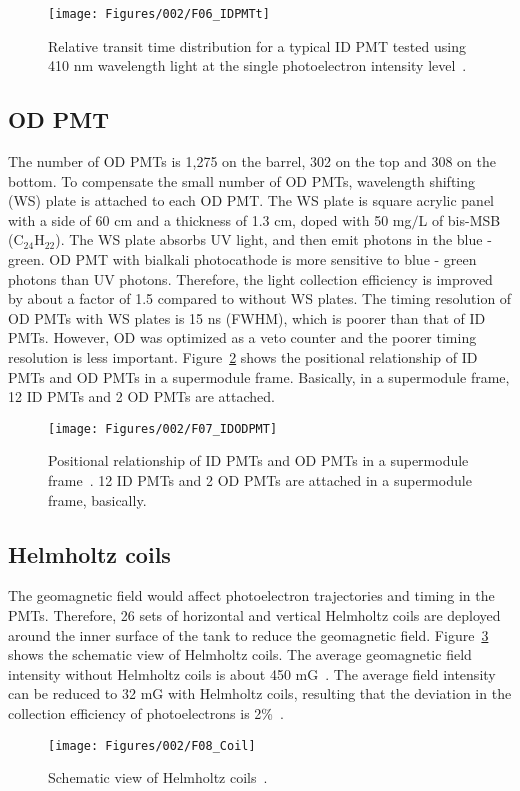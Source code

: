 \begin{figure}[tbp]
	\centering
	\texttt{[image: Figures/002/F06\_IDPMTt]}
	\caption[Relative transit time distribution for a typical ID PMT tested using 410 nm wavelength light at the single photoelectron intensity level]{\label{002_F06_IDPMTt} Relative transit time distribution for a typical ID PMT tested using 410 nm wavelength light at the single photoelectron intensity level~\cite{2003Fukuda}.}
\end{figure}

\subsection{OD PMT}
\vs\hs The number of OD PMTs is 1,275 on the barrel, 302 on the top and 308 on the bottom.
To compensate the small number of OD PMTs, wavelength shifting (WS) plate is attached to each OD PMT.
The WS plate is square acrylic panel with a side of 60 cm and a thickness of 1.3 cm, doped with 50 mg$/$L of bis-MSB (C$_{\text{24}}$H$_{\text{22}}$).
The WS plate absorbs UV light, and then emit photons in the blue - green.
OD PMT with bialkali photocathode is more sensitive to blue - green photons than UV photons.
Therefore, the light collection efficiency is improved by about a factor of 1.5 compared to without WS plates.
The timing resolution of OD PMTs with WS plates is 15 ns (FWHM), which is poorer than that of ID PMTs.
However, OD was optimized as a veto counter and the poorer timing resolution is less important.
Figure~\ref{002_F07_IDODPMT} shows the positional relationship of ID PMTs and OD PMTs in a supermodule frame.
Basically, in a supermodule frame, 12 ID PMTs and 2 OD PMTs are attached.

\begin{figure}[h]
	\centering
	\texttt{[image: Figures/002/F07\_IDODPMT]}
	\caption[Positional relationship of ID PMTs and OD PMTs in a supermodule frame]{\label{002_F07_IDODPMT} Positional relationship of ID PMTs and OD PMTs in a supermodule frame~\cite{1997ZoaPhD}. 12 ID PMTs and 2 OD PMTs are attached in a supermodule frame, basically.}
\end{figure}

\subsection{Helmholtz coils}
\vs\hs The geomagnetic field would affect photoelectron trajectories and timing in the PMTs.
Therefore, 26 sets of horizontal and vertical Helmholtz coils are deployed around the inner surface of the tank to reduce the geomagnetic field.
Figure~\ref{002_F08_Coil} shows the schematic view of Helmholtz coils.
The average geomagnetic field intensity without Helmholtz coils is about 450 mG~\cite{2003Fukuda}.
The average field intensity can be reduced to 32 mG with Helmholtz coils, resulting that the deviation in the collection efficiency of photoelectrons is 2\%~\cite{2014AbeCalib}.

\begin{figure}[tbp]
	\centering
	\texttt{[image: Figures/002/F08\_Coil]}
	\caption[Schematic view of Helmholtz coils]{\label{002_F08_Coil} Schematic view of Helmholtz coils~\cite{1998YamaguchiPhD}.}
\end{figure}

\newpage
